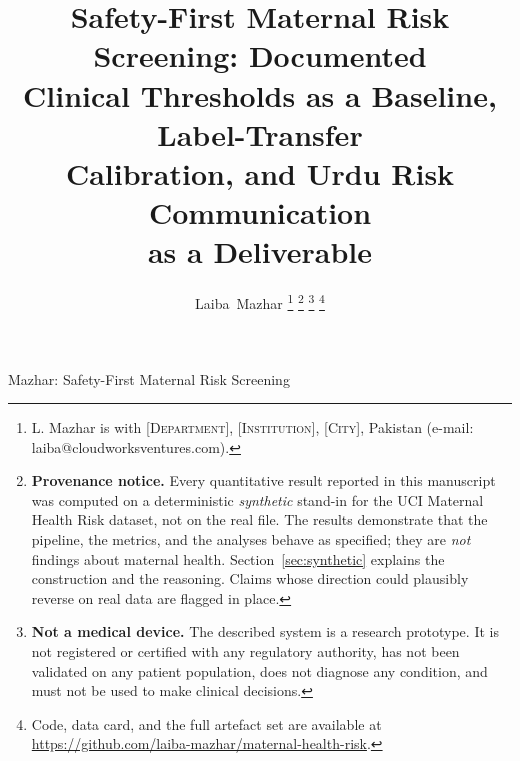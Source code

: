 \documentclass[journal]{IEEEtran}
\begin{document}
\title{Safety-First Maternal Risk Screening: Documented\\ Clinical Thresholds as a Baseline, Label-Transfer\\ Calibration, and Urdu Risk Communication\\ as a Deliverable}

\author{Laiba~Mazhar%
\thanks{L. Mazhar is with \textsc{[Department]}, \textsc{[Institution]},
\textsc{[City]}, Pakistan (e-mail: laiba@cloudworksventures.com).}%
\thanks{\textbf{Provenance notice.} Every quantitative result reported in this
manuscript was computed on a deterministic \emph{synthetic} stand-in for the UCI
Maternal Health Risk dataset, not on the real file. The results demonstrate that
the pipeline, the metrics, and the analyses behave as specified; they are
\emph{not} findings about maternal health. Section~\ref{sec:synthetic} explains
the construction and the reasoning. Claims whose direction could plausibly
reverse on real data are flagged in place.}%
\thanks{\textbf{Not a medical device.} The described system is a research
prototype. It is not registered or certified with any regulatory authority, has
not been validated on any patient population, does not diagnose any condition,
and must not be used to make clinical decisions.}%
\thanks{Code, data card, and the full artefact set are available at
\url{https://github.com/laiba-mazhar/maternal-health-risk}.}}

%
{Mazhar: Safety-First Maternal Risk Screening}

\maketitle
\end{document}
